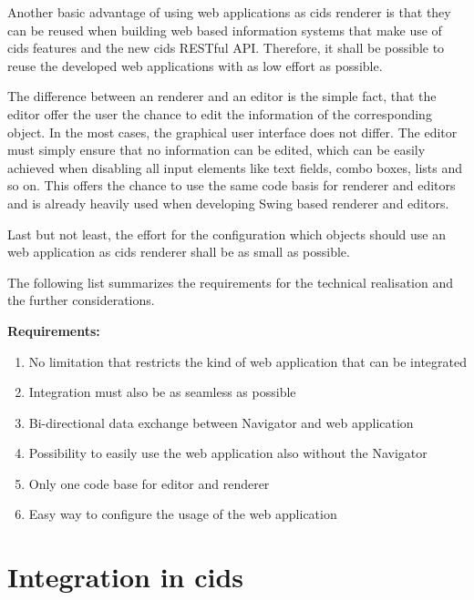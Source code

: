 
Another basic advantage of using web applications as cids renderer is that they can be reused when building web based information systems that make use of cids features and the new cids RESTful API.
Therefore, it shall be possible to reuse the developed web applications with as low effort as possible.

The difference between an renderer and an editor is the simple fact, that the editor offer the user the chance to edit the information of the corresponding object. 
In the most cases, the graphical user interface does not differ. 
The editor must simply ensure that no information can be edited, which can be easily achieved when disabling all input elements like text fields, combo boxes, lists and so on. 
This offers the chance to use the same code basis for renderer and editors and is already heavily used when developing Swing based renderer and editors.

Last but not least, the effort for the configuration which objects should use an web application as cids renderer shall be as small as possible.

The following list summarizes the requirements for the technical realisation and the further considerations.

\textbf{Requirements:}
\begin{enumerate}
\item No limitation that restricts the kind of web application that can be integrated
\item Integration must also be as seamless as possible 
\item Bi-directional data exchange between Navigator and web application
\item Possibility to easily use the web application also without the Navigator
\item Only one code base for editor and renderer
\item Easy way to configure the usage of the web application
\end{enumerate} 


\section{Integration in cids}


